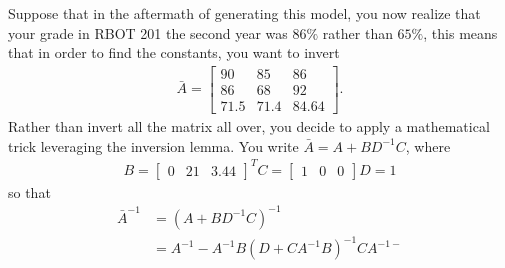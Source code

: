 \begin{example}
	Suppose that in the aftermath of generating this model, you now realize that your grade in RBOT 201  the second year was $86\%$ rather than $65\%$, this means that in order to find the constants, you want to invert
	\begin{align}
	\bar{A} = \begin{bmatrix}
	90 & 85 & 86 \\
	86 & 68 & 92 \\
	71.5 & 71.4 & 84.64
	\end{bmatrix}.
	\end{align}
	Rather than invert all the matrix all over, you decide to apply a mathematical trick leveraging the inversion lemma. You write $\bar{A} = A + BD^{-1}C$, where 
	\begin{subequations}
		\begin{align}
			B = \begin{bmatrix}
					0 & 21 & 3.44
			\end{bmatrix}^T
			C = \begin{bmatrix}
			1 & 0 & 0
			\end{bmatrix}
			D = 1
		\end{align}
	\end{subequations}
so that 
%
\begin{align}
	\bar{A}^{-1} &= \left(A + BD^{-1}C\right)^{-1} \\
						&= A^{-1} - A^{-1} B\left(D + C A^{-1}B\right)^{-1} C A^{-1-}
\end{align}
\end{example}